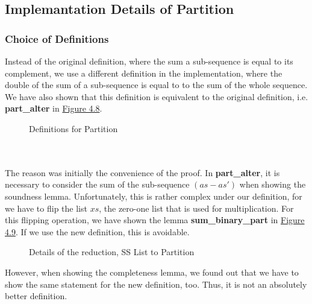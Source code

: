 \subsection{Implemantation Details of Partition}
\subsubsection{Choice of Definitions}
Instead of the original definition, where the sum a sub-sequence is equal to its complement, we use a different definition in the implementation,
where the double of the sum of a sub-sequence is equal to to the sum of the whole sequence. We have also shown that this definition is equivalent 
to the original definition, i.e. \textbf{part\_alter} in \hyperref[fig:4.8]{Figure 4.8}. 
\begin{figure}[!h]
    \caption{Definitions for Partition}
    \label{fig:4.8}
\end{figure}\\\\
The reason was initially the convenience of the proof. 
In \textbf{part\_alter}, it is necessary to consider the sum of the sub-sequence $(as - as')$ when showing the soundness lemma. 
Unfortunately, this is rather complex under our definition, for we have to flip the list $xs$, the zero-one list that is used for multiplication. For this 
flipping operation, we have shown the lemma \textbf{sum\_binary\_part} in \hyperref[fig:4.9]{Figure 4.9}. If we use the new definition, this is avoidable.
\begin{figure}[!h]
    \caption{Details of the reduction, SS List to Partition}
    \label{fig:4.9}
\end{figure}
However, when showing the completeness lemma, we found out that we have to show the same statement for the new definition, too. 
Thus, it is not an absolutely better definition. 
